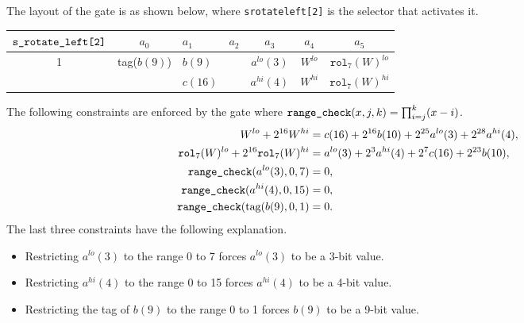 \documentclass[10pt]{article}
\begin{document}
The layout of the gate is as shown below, where \texttt{s\textunderscore rotate\textunderscore left[2]} is the selector that activates it.

\begin{center}
  \begin{tabular}{c|c|l|l|c|c|c}
    $\texttt{s\textunderscore rotate\textunderscore left[2]}$ & $a_0$ & $a_1$ & $a_2$ & $a_3$ & $a_4$ & $a_5$ \\ \hline
    1  & tag($b(9)$) & $b(9)$ &                        & $a^{lo}(3)$ & $W^{lo}$  & $\texttt{rol}_7(W)^{lo}$  \\ 
       &              & $c(16)$ &                        & $a^{hi}(4)$ & $W^{hi}$  & $\texttt{rol}_7(W)^{hi}$  \\ \hline
  \end{tabular}
\end{center}

The following constraints are enforced by the gate where $\texttt{range\textunderscore check}(x, j, k) = \prod_{i=j}^k (x-i)$.
\begin{align*}
  W^{lo} + 2^{16} W^{hi} & = c(16) + 2^{16} b(10) + 2^{25} a^{lo}(3) + 2^{28} a^{hi}(4),\\
  \texttt{rol}_7(W)^{lo} + 2^{16} \texttt{rol}_7(W)^{hi} & = a^{lo}(3) + 2^{3} a^{hi}(4) + 2^7 c(16) + 2^{23} b(10),\\
  \texttt{range\textunderscore check}(a^{lo}(3), 0, 7) & = 0,\\
  \texttt{range\textunderscore check}(a^{hi}(4), 0, 15) & = 0,\\
  \texttt{range\textunderscore check}(\text{tag}(b(9), 0, 1) & = 0.
\end{align*}
The last three constraints have the following explanation.
\begin{itemize}
\item Restricting $a^{lo}(3)$ to the range 0 to 7 forces $a^{lo}(3)$ to be a 3-bit value.
\item Restricting $a^{hi}(4)$ to the range 0 to 15 forces $a^{hi}(4)$ to be a 4-bit value.
\item Restricting the tag of $b(9)$ to the range 0 to 1 forces $b(9)$ to be a 9-bit value.
\end{itemize}
\end{document}
